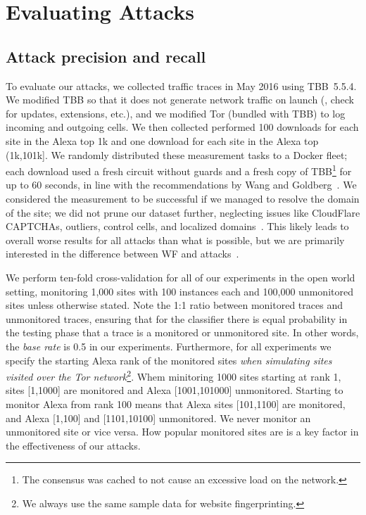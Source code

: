 \section{Evaluating \name Attacks}
\label{sec:analysis}

\subsection{Attack precision and recall}

To evaluate our \name attacks, we collected traffic traces in May
2016 using TBB~5.5.4.
We modified TBB so that it does not generate network traffic on launch
(\ie, check for
updates, extensions, etc.), and we modified 
Tor (bundled with TBB) to log incoming and outgoing cells.
We then collected performed 100 downloads for each site in the Alexa top
1k and one download for each site in the 
Alexa top (1k,101k]. We randomly distributed these measurement tasks
to a Docker fleet; each download used a fresh circuit without
guards and a fresh copy of TBB\footnote{The consensus was cached to not
cause an excessive load on the network.} for up to 60 seconds,
in line with the recommendations by Wang and Goldberg~\cite{Wang2013a}.
We considered the measurement to be successful if we managed to resolve
the domain of the site; 
we did not prune our dataset further, neglecting issues like CloudFlare
CAPTCHAs, outliers, control cells, and localized domains~\cite{Juarez2014a}.
This likely leads to overall worse results for all attacks than what is
possible, but we are primarily interested in the difference between WF and
\name attacks~\cite{Wang2013a}.

We perform ten-fold cross-validation for all of our experiments in the open
world setting, monitoring 1,000 sites with 100 instances each and
100,000 unmonitored sites unless otherwise stated.
Note the 1:1 ratio between monitored traces and unmonitored traces,
ensuring that for the classifier there is equal probability in the testing
phase that a trace is a monitored or unmonitored site.
In other words, the \emph{base rate} is 0.5 in our experiments.
Furthermore, for all experiments we specify the starting Alexa rank of the
monitored sites
\emph{when simulating sites visited over the Tor network}\footnote{We always
use the same sample data for website fingerprinting.}.
Whem minitoring 1000 sites starting at rank 1, sites
[1,1000] are monitored and Alexa [1001,101000] unmonitored. Starting to
monitor Alexa from rank 100 means that Alexa sites [101,1100] are monitored,
and Alexa [1,100] and [1101,10100] unmonitored.
We never monitor an unmonitored site or vice versa.
How popular monitored sites
are is a key factor in the effectiveness of our attacks.

